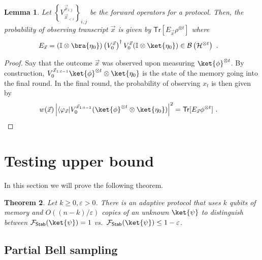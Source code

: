 \documentclass[11pt]{article}
\newtheorem{theorem}{Theorem}[section]
\newtheorem{lemma}[theorem]{Lemma}
\newcommand{\Sh}{\ensuremath{\textsf{Stab}}}
\newcommand{\id}{\ensuremath{\mathbb{I}}}
\newcommand{\Tr}{\mathsf{Tr}}
\newcommand{\Hc}{\mathcal{H}}
\begin{document}
\begin{lemma}\label{lem:protocol_povm}
    Let $\left\{V_{\vec{x}_{<i}}^{\vec{x}_{i:j}}\right\}_{i,j}$ be the forward operators for a protocol. Then, the probability of observing transcript $\vec{x}$ is given by $\Tr[E_{\vec{x}} \rho^{\otimes t}]$ where
    \begin{align}
        E_{\vec{x}} & = (\id \otimes \bra{\eta_0}) \left( V^{\vec{x}}_0 \right)^\dagger V_0^{\vec{x}} (\id \otimes \ket{\eta_0}) \in \mathcal{B}\left(\Hc^{\otimes t}\right)\ .
    \end{align}
\end{lemma}
\begin{proof}
    Say that the outcome $\vec{x}$ was observed upon measuring $\ket{\phi}^{\otimes t}$. By construction, $V_0^{\vec{x}_{1:t-1}}\ket{\phi}^{\otimes t}\otimes \ket{\eta_0}$
    is the state of the memory going into the final round. In the final round, the probability of observing $x_t$ is then given by
    \begin{align}
        w(\vec{x})\left\vert \langle \varphi_{\vec{x}}\vert V_0^{\vec{x}_{1:t-1}}(\ket{\phi}^{\otimes t}\otimes \ket{\eta_0})\right\vert^2 & = \Tr[E_{\vec{x}} \phi^{\otimes t}]\ .
    \end{align}
\end{proof}



\section{Testing upper bound}

In this section we will prove the following theorem.

\begin{theorem}\label{thm:upper}
    Let $k\geq 0,\varepsilon>0$. There is an adaptive protocol that uses $k$ qubits of memory and $O((n-k)/\varepsilon)$ copies of an unknown $\ket{\psi}$ to distinguish between $\mathcal{F}_{\cal \Sh}(\ket{\psi})=1$ vs.~$\mathcal{F}_{\cal \Sh}(\ket{\psi})\leq 1-\varepsilon$.
\end{theorem}


\subsection{Partial Bell sampling}
\end{document}
